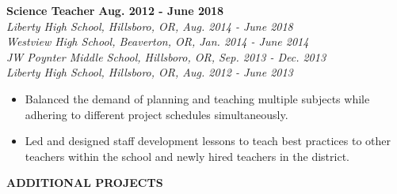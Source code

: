 \documentclass[11pt]{article}
\begin{document}
\medbreak \noindent
%
\textbf{Science Teacher} \hfill \textbf{Aug. 2012 - June 2018}\\
\textsl{Liberty High School, Hillsboro, OR, Aug. 2014 - June 2018}\\
\textsl{Westview High School, Beaverton, OR, Jan. 2014 - June 2014}\\
\textsl{JW Poynter Middle School, Hillsboro, OR, Sep. 2013 - Dec. 2013}\\
\textsl{Liberty High School, Hillsboro, OR, Aug. 2012 - June 2013}
\begin{itemize}[leftmargin=*, itemsep=0pt, topsep=5pt]
	\item Balanced the demand of planning and teaching multiple subjects while adhering to different project schedules simultaneously.
	\item Led and designed staff development lessons to teach best practices to other teachers within the school and newly hired teachers in the district.
\end{itemize}
\bigbreak \noindent
%
%
\noindent
\makebox[0pt][l]{\rule[-.2\baselineskip]{\linewidth}{.3mm}}\large{\textbf{ADDITIONAL PROJECTS}}
\end{document}
